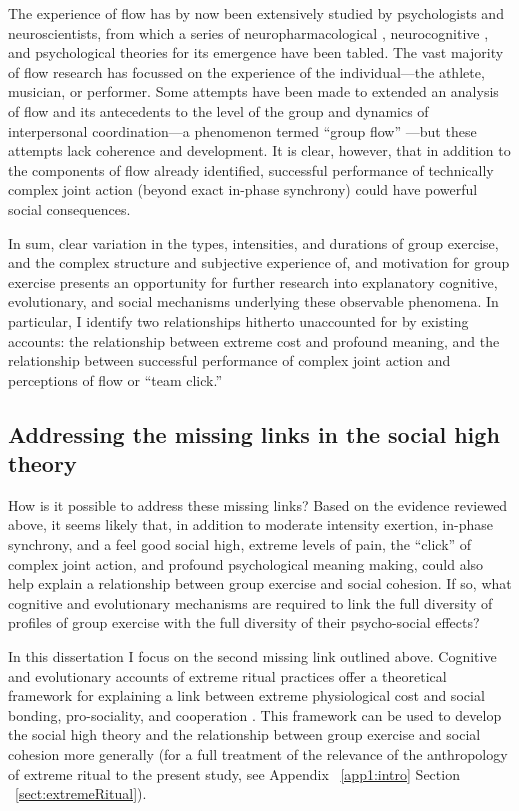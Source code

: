 \begin{CJK}{UTF8}{gbsn}
The experience of flow has by now been extensively studied by psychologists and neuroscientists, from which a series of neuropharmacological \citep{Boecker2008}, neurocognitive \citep{Dietrich2006,Dietrich2011,Labelle2013}, and psychological \citep{Csikszentmihalyi1992} theories for its emergence have been tabled.  The vast majority of flow research has focussed on the experience of the individual---the athlete, musician, or performer.  Some attempts have been made to extended an analysis of flow and its antecedents to the level of the group and dynamics of interpersonal coordination---a phenomenon termed ``group flow'' \citep{Sawyer2006}---but these attempts lack coherence and development.
It is clear, however, that in addition to the components of flow already identified, successful performance of technically complex joint action (beyond exact in-phase synchrony) could have powerful social consequences.

In sum, clear variation in the types, intensities, and durations of group exercise, and the complex structure and subjective experience of, and motivation for group exercise presents an opportunity for further research into explanatory cognitive, evolutionary, and social mechanisms underlying these observable phenomena.  In particular, I identify two relationships hitherto unaccounted for by existing accounts: the relationship between extreme cost and profound meaning, and the relationship between successful performance of complex joint action and perceptions of flow or ``team click.''


\subsection{Addressing the missing links in the social high theory}
How is it possible to address these missing links?
Based on the evidence reviewed above, it seems likely that, in addition to moderate intensity exertion, in-phase synchrony, and a feel good social high, extreme levels of pain, the ``click'' of complex joint action, and profound psychological meaning making, could also help explain a relationship between group exercise and social cohesion. If so, what cognitive and evolutionary mechanisms are required to link the full diversity of profiles of group exercise with the full diversity of their psycho-social effects?

In this dissertation I focus on the second missing link outlined above. Cognitive and evolutionary accounts of extreme ritual practices offer a theoretical framework for explaining a link between extreme physiological cost and social bonding, pro-sociality, and cooperation \citep{Whitehouse2014,Whitehouse2017}. This framework can be used to develop the social high theory and the relationship between group exercise and social cohesion more generally (for a full treatment of the relevance of the anthropology of extreme ritual to the present study, see Appendix ~\ref{app1:intro} Section ~\ref{sect:extremeRitual}).


\end{CJK}
